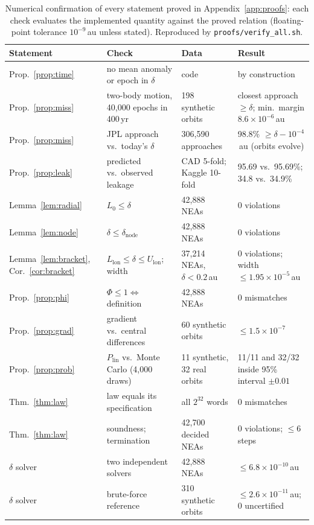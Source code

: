 \begin{table}[t]
\centering
\footnotesize
\caption{Numerical confirmation of every statement proved in Appendix~\ref{app:proofs}: each check evaluates the implemented quantity against the proved relation (floating-point tolerance $10^{-9}$\,au unless stated). Reproduced by \texttt{proofs/verify\_all.sh}.}
\label{tab:proofs}
\begin{tabularx}{\textwidth}{@{}>{\raggedright\arraybackslash}p{2.6cm}YYY@{}}
\toprule
Statement & Check & Data & Result \\
\midrule
Prop.~\ref{prop:time} & no mean anomaly or epoch in $\delta$ & code & by construction \\
Prop.~\ref{prop:miss} & two-body motion, 40,000 epochs in 400\,yr & 198 synthetic orbits & closest approach $\ge\delta$; min.\ margin $8.6\times10^{-6}$\,au \\
Prop.~\ref{prop:miss} & JPL approach vs.\ today's $\delta$ & 306,590 approaches & 98.8\% $\ge \delta - 10^{-4}$\,au (orbits evolve) \\
Prop.~\ref{prop:leak} & predicted vs.\ observed leakage & CAD 5-fold; Kaggle 10-fold & 95.69 vs.\ 95.69\%; 34.8 vs.\ 34.9\% \\
Lemma~\ref{lem:radial} & $L_0 \le \delta$ & 42,888 NEAs & 0 violations \\
Lemma~\ref{lem:node} & $\delta \le \delta_{\mathrm{node}}$ & 42,888 NEAs & 0 violations \\
Lemma~\ref{lem:bracket}, Cor.~\ref{cor:bracket} & $L_{\mathrm{lon}} \le \delta \le U_{\mathrm{lon}}$; width & 37,214 NEAs, $\delta < 0.2$\,au & 0 violations; width $\le 1.95\times10^{-5}$\,au \\
Prop.~\ref{prop:phi} & $\Phi \le 1 \Leftrightarrow$ definition & 42,888 NEAs & 0 mismatches \\
Prop.~\ref{prop:grad} & gradient vs.\ central differences & 60 synthetic orbits & $\le 1.5\times10^{-7}$ \\
Prop.~\ref{prop:prob} & $P_{\mathrm{lin}}$ vs.\ Monte Carlo (4,000 draws) & 11 synthetic, 32 real orbits & 11/11 and 32/32 inside 95\% interval $\pm0.01$ \\
Thm.~\ref{thm:law} & law equals its specification & all $2^{32}$ words & 0 mismatches \\
Thm.~\ref{thm:law} & soundness; termination & 42,700 decided NEAs & 0 violations; $\le 6$ steps \\
$\delta$ solver & two independent solvers & 42,888 NEAs & $\le 6.8\times10^{-10}$\,au \\
$\delta$ solver & brute-force reference & 310 synthetic orbits & $\le 2.6\times10^{-11}$\,au; 0 uncertified \\
\bottomrule
\end{tabularx}
\end{table}
